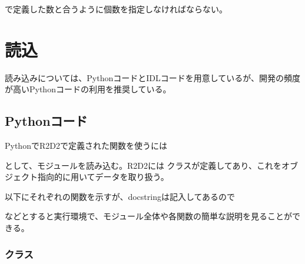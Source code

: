 \documentclass[letterpaper,10pt,dvipdfmx,report]{sphinxmanual}
\begin{document}
 で定義した数と合うように個数を指定しなければならない。


\section{読込}
\label{\detokenize{io:id3}}
読み込みについては、PythonコードとIDLコードを用意しているが、開発の頻度が高いPythonコードの利用を推奨している。


\subsection{Pythonコード}
\label{\detokenize{io:module-R2D2}}\label{\detokenize{io:python}}
PythonでR2D2で定義された関数を使うには

\begin{sphinxVerbatim}[commandchars=\\\{\}]
 
\end{sphinxVerbatim}

として、モジュールを読み込む。R2D2には {\hyperref[\detokenize{io:R2D2.R2D2_data}]{}} クラスが定義してあり、これをオブジェクト指向的に用いてデータを取り扱う。

以下にそれぞれの関数を示すが、docstringは記入してあるので

\begin{sphinxVerbatim}[commandchars=\\\{\}]
\end{sphinxVerbatim}

などとすると実行環境で、モジュール全体や各関数の簡単な説明を見ることができる。


\subsubsection{クラス}
\label{\detokenize{io:id4}}

\begin{fulllineitems}
\label{\detokenize{io:R2D2.R2D2_data}}
\end{fulllineitems}
\end{document}
